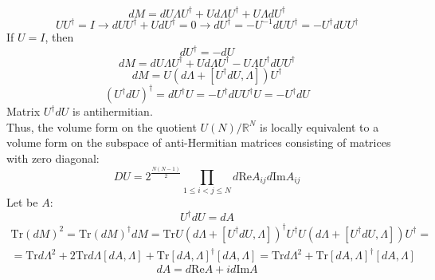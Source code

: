 \documentclass[12pt]{article}
\theoremstyle{definition}
\begin{document}
\begin{enumerate}
\begin{itemize}
        \begin{equation}
            dM=dU\Lambda U^\dagger+Ud\Lambda U^\dagger+U\Lambda dU^\dagger
        \end{equation}
        \begin{equation}
            UU^\dagger=I\rightarrow dUU^\dagger+UdU^\dagger=0\rightarrow dU^\dagger=-U^{-1}dUU^\dagger=-U^\dagger dUU^\dagger
        \end{equation}
        If $U=I$, then
        \begin{equation}
            dU^\dagger=-dU
        \end{equation}
        \begin{equation}
            dM=dU\Lambda U^\dagger+Ud\Lambda U^\dagger-U\Lambda U^\dagger dUU^\dagger
        \end{equation}
        \begin{equation}
            dM=U(d\Lambda+[U^\dagger dU,\Lambda])U^\dagger
        \end{equation}
        \begin{equation}
            (U^\dagger dU)^\dagger=dU^\dagger U=-U^\dagger dUU^\dagger U=-U^\dagger dU
        \end{equation}
        Matrix $U^\dagger dU$ is antihermitian.\\
        Thus, the volume form on the quotient $U(N)/\mathbb{R}^N$ is locally equivalent to a volume form on the subspace of anti-Hermitian matrices consisting of matrices with zero diagonal:
        \begin{equation}
            DU=2^{\frac{N(N-1)}{2}}\prod\limits_{1\leq i<j\leq N}d\text{Re}A_{ij}d\text{Im}A_{ij}
        \end{equation}
        Let be $A$:
        \begin{equation}
            U^\dagger dU=dA
        \end{equation}
        \begin{multline}
            \text{Tr}(dM)^2=\text{Tr}(dM)^\dagger dM=\text{Tr}U(d\Lambda+[U^\dagger dU,\Lambda])^\dagger U^\dagger U(d\Lambda+[U^\dagger dU,\Lambda])U^\dagger=\\=\text{Tr}d\Lambda^2+2\text{Tr}d\Lambda[dA,\Lambda]+\text{Tr}[dA,\Lambda]^\dagger[dA,\Lambda]=\text{Tr}d\Lambda^2+\text{Tr}[dA,\Lambda]^\dagger[dA,\Lambda]
        \end{multline}
        \begin{equation}
            dA=d\text{Re}A+id\text{Im}A
        \end{equation}
        \begin{multline}

\end{multline}
\end{itemize}
\end{enumerate}
\end{document}
